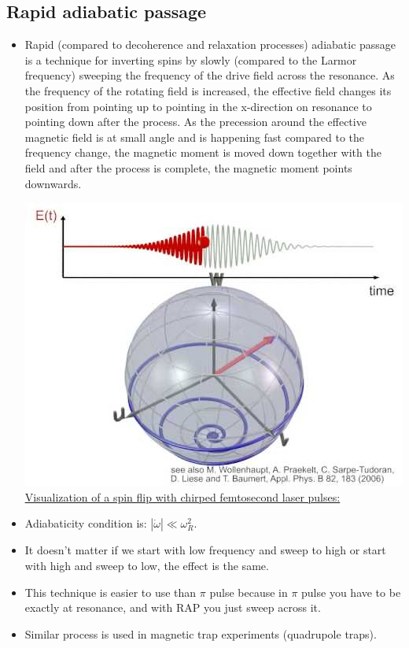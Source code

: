 \documentclass[AtomicOptical1Notes.tex]{subfiles}
\begin{document}
	\subsection{Rapid adiabatic passage}
		\begin{itemize}
			\item Rapid (compared to decoherence and relaxation processes) adiabatic passage is a technique for inverting spins by slowly (compared to the Larmor frequency) sweeping the frequency of the drive field across the resonance. As the frequency of the rotating field is increased, the effective field changes its position from pointing up to pointing in the x-direction on resonance to pointing down after the process. As the precession around the effective magnetic field is at small angle and is happening fast compared to the frequency change, the magnetic moment is moved down together with the field and after the process is complete, the magnetic moment points downwards.
			
			\includegraphics{spinflip}
			\href{https://www.youtube.com/watch?v=n4iIx8XuJlU}{\color{blue} \underline{Visualization of a spin flip with chirped femtosecond laser pulses:}}
			
			\item Adiabaticity condition is: $ |\dot{\omega}| \ll \omega_R^2$.
			\item It doesn't matter if we start with low frequency and sweep to high or start with high and sweep to low, the effect is the same.
			\item This technique is easier to use than $\pi$ pulse because in $\pi$ pulse you have to be exactly at resonance, and with RAP you just sweep across it.
			\item Similar process is used in magnetic trap experiments (quadrupole traps).
		\end{itemize}
\end{document}
